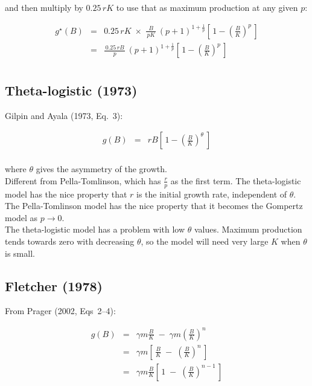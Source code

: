 \documentclass[fleqn]{article}
\begin{document}
and then multiply by $0.25\,rK$ to use that as maximum production at any given
$p$:

\begin{eqnarray*}
  g^\star(B) &=& 0.25\,rK \;\times\;
  \frac{B}{\,pK\,}\,(p\!+\!1)^{1+\frac{1}{p}}\!
  \left[\,1-\left(\frac{B}{K}\right)^p\,\right]                \\[1em]
  ~ &=& \frac{\,0.25\,rB\,}{\,p\,}\,(p\!+\!1)^{1+\frac{1}{p}}\!
  \left[\,1-\left(\frac{B}{K}\right)^p\,\right]                \\[1ex]
\end{eqnarray*}

\newpage

\subsection{Theta-logistic (1973)}

Gilpin and Ayala (1973, Eq.~3):

\begin{eqnarray*}
  g(B) &=& rB\!\left[\,1\!-\!\left(\frac{B}{K}\right)^{\!\theta}\:\right]\\[1ex]
\end{eqnarray*}

where $\theta$ gives the asymmetry of the growth.\\[1em]

Different from Pella-Tomlinson, which has $\frac{r}{p}$ as the first term. The
theta-logistic model has the nice property that $r$ is the initial growth rate,
independent of $\theta$. The Pella-Tomlinson model has the nice property that it
becomes the Gompertz model as $p\to 0$.\\[1em]

The theta-logistic model has a problem with low $\theta$ values. Maximum
production tends towards zero with decreasing $\theta$, so the model will need
very large $K$ when $\theta$ is small.

\newpage

\subsection{Fletcher (1978)}

From Prager (2002, Eqs~2--4):

\begin{eqnarray*}
  g(B) &=& \gamma m\frac{B}{K} \;-\;
  \gamma m\left(\frac{B}{K}\right)^{\!n}       \\[1em]
  ~    &=& \gamma m\left[\,\frac{B}{K} \;-\;
    \left(\frac{B}{K}\right)^{\!\!n}\,\right]  \\[1em]
  ~    &=& \gamma m\frac{B}{K}\left[\,1 \;-\;
    \left(\frac{B}{K}\right)^{\!\!n-1}\,\right]\\[1ex]
\end{eqnarray*}
\end{document}
